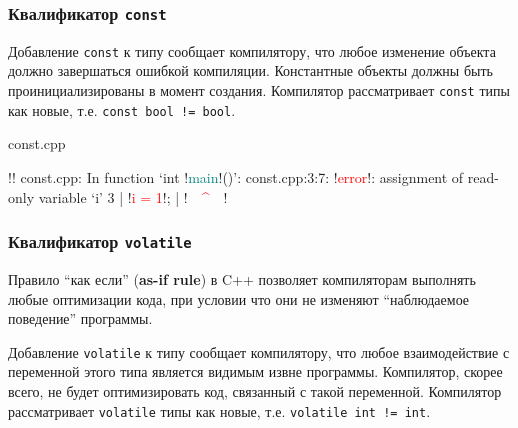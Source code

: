 \documentclass[compress, 8pt, aspectratio=169]{beamer}
\begin{document}
\begin{frame}[fragile]

    \frametitle{Квалификатор \texttt{const}}

    Добавление \verb|const| к типу сообщает компилятору, что
    любое изменение объекта должно завершаться ошибкой компиляции.
    Константные объекты должны быть проинициализированы в момент
    создания.
    Компилятор рассматривает \verb|const| типы как новые,
    т.е. \verb|const bool != bool|.

        {const.cpp}

    \begin{terminalwindow}
!!
const.cpp: In function ‘int !\textcolor{teal}{main}!()’:
const.cpp:3:7: !\textcolor{red}{error}!: assignment of read-only variable ‘i’
    3 |     !\textcolor{red}{i = 1}!;
      |     !\textcolor{red}{~~\^{}~~}!
    \end{terminalwindow}

\end{frame}

\begin{frame}[fragile]

    \frametitle{Квалификатор \texttt{volatile}}

    Правило \enquote{как если} (\textbf{as-if rule}) в C++ позволяет компиляторам
    выполнять любые оптимизации кода, при условии что они не изменяют
    \enquote{наблюдаемое поведение} программы.

    \hfill \break

    Добавление \verb|volatile| к типу сообщает компилятору, что
    любое взаимодействие с переменной этого типа является
    видимым извне программы. Компилятор, скорее всего, не
    будет оптимизировать код, связанный с такой переменной.
    Компилятор рассматривает \verb|volatile| типы как новые,
    т.е. \verb|volatile int != int|.

\end{frame}
\end{document}
